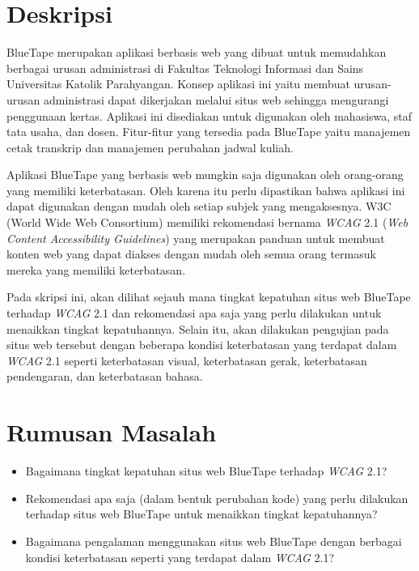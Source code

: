 \documentclass[a4paper,twoside]{article}
\begin{document}
\title{\@judultopik}
\author{\nama \textendash \@npm} 

\newcommand{\nama}{Hizkia Steven}
\newcommand{\@npm}{2015730020}
\newcommand{\@judultopik}{Kepatuhan dan Rekomendasi Perbaikan Web Content Accessibility Guideline untuk Aplikasi BlueTape} %
\newcommand{\jumpemb}{1} %
\newcommand{\tanggal}{01/01/1900}


\maketitle


\section{Deskripsi}
BlueTape merupakan aplikasi berbasis web yang dibuat untuk memudahkan berbagai urusan administrasi di Fakultas Teknologi Informasi dan Sains Universitas Katolik Parahyangan. Konsep aplikasi ini yaitu membuat urusan-urusan administrasi dapat dikerjakan melalui situs web sehingga mengurangi penggunaan kertas. Aplikasi ini disediakan untuk digunakan oleh mahasiswa, staf tata usaha, dan dosen. Fitur-fitur yang tersedia pada BlueTape yaitu manajemen cetak transkrip dan manajemen perubahan jadwal kuliah.

Aplikasi BlueTape yang berbasis web mungkin saja digunakan oleh orang-orang yang memiliki keterbatasan. Oleh karena itu perlu dipastikan bahwa aplikasi ini dapat digunakan dengan mudah oleh setiap subjek yang mengaksesnya. W3C (World Wide Web Consortium) memiliki rekomendasi bernama \textit{WCAG} 2.1 (\textit{Web Content Accessibility Guidelines}) yang merupakan panduan untuk membuat konten web yang dapat diakses dengan mudah oleh semua orang termasuk mereka yang memiliki keterbatasan.

Pada skripsi ini, akan dilihat sejauh mana tingkat kepatuhan situs web BlueTape terhadap \textit{WCAG} 2.1 dan rekomendasi apa saja yang perlu dilakukan untuk menaikkan tingkat kepatuhannya. Selain itu, akan dilakukan pengujian pada situs web tersebut dengan beberapa kondisi keterbatasan yang terdapat dalam \textit{WCAG} 2.1 seperti keterbatasan visual, keterbatasan gerak, keterbatasan pendengaran, dan keterbatasan bahasa.

\section{Rumusan Masalah}
\begin{itemize}
	\item Bagaimana tingkat kepatuhan situs web BlueTape terhadap \textit{WCAG} 2.1?
	\item Rekomendasi apa saja (dalam bentuk perubahan kode) yang perlu dilakukan terhadap situs web BlueTape untuk menaikkan tingkat kepatuhannya?  
	\item Bagaimana pengalaman menggunakan situs web BlueTape dengan berbagai kondisi keterbatasan seperti yang terdapat dalam \textit{WCAG} 2.1?
\end{itemize}
\end{document}
